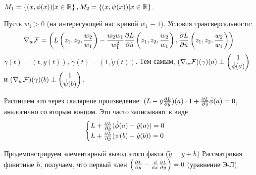 \documentclass[a4paper]{article}
\begin{document}
    $M_1 = \left\{(x, \phi(x))\middle|x \in \mathbb{R}\right\}, M_2 = \left\{(x, \psi(x))\middle|x \in \mathbb{R}\right\}$.

    Пусть $w_1 > 0$ (на интересующей нас кривой $w_1 \equiv 1$).
    Условия трансверсальности: \[\nabla_w\mathcal{F} = \left(L\left(z_1, z_2, \frac{w_2}{w_1}\right) - \frac{w_2 w_1}{w_1^2}\frac{\partial L}{\partial \dot{u}}\left(z_1, z_2, \frac{w_2}{w_1}\right) , \frac{\partial L}{\partial \dot{u}}\left(z_1, z_2, \frac{w_2}{w_1}\right)\right)\]
    $\gamma(t) = (t, y(t))$, $\dot{\gamma}(t) = (1, \dot{y}(t))$.
    Тем самым, $(\nabla_w\mathcal{F})(\gamma)(a) \perp \begin{pmatrix}1 \\ \dot{\phi}(a)\end{pmatrix}$ и $(\nabla_w\mathcal{F})(\gamma)(b) \perp \begin{pmatrix}1 \\ \dot{\psi}(b)\end{pmatrix}$.

    Распишем это через скалярное произведение: $(L - \dot{y}\frac{\partial L}{\partial \dot{y}})(a) \cdot 1 + \frac{\partial L}{\partial \dot{y}}\dot{\phi}(a) = 0$,
    аналогично со вторым концом. Это часто записывают в виде
    \[\begin{cases}L + \frac{\partial L}{\partial \dot{y}}(\dot{\phi}(a) - \dot{y}(a)) = 0 \\ L + \frac{\partial L}{\partial \dot{y}}(\dot{\psi}(b) - \dot{y}(b)) = 0\end{cases}\] %

    Продемонстрируем элементарный вывод этого факта ($\tilde y = y + h$)
%
    Рассматривая финитные $h$, получаем, что первый член $\left(\frac{\partial L}{\partial y} - \frac{\operatorname{d}\!}{\operatorname{d}\! x}\frac{\partial L}{\partial \dot{y}}\right) = 0$ (уравнение Э-Л).
\end{document}
